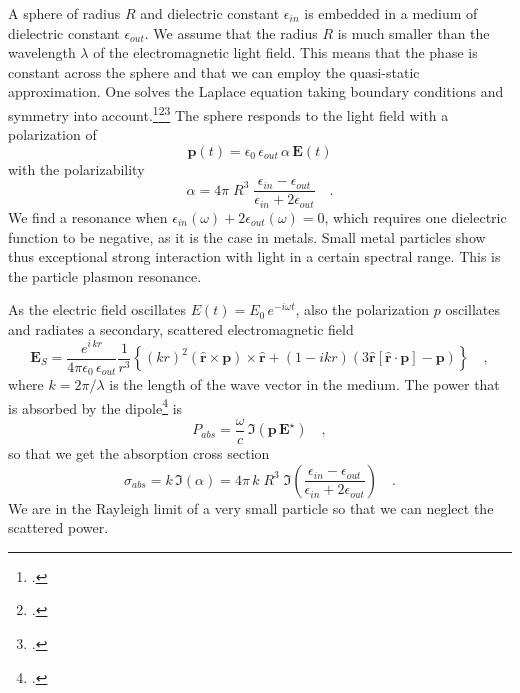 A sphere of radius $R$ and dielectric constant $\epsilon_{in}$ is embedded in a medium of dielectric constant $\epsilon_{out}$. We assume that the radius $R$ is much smaller than the wavelength $\lambda$ of the electromagnetic light field. This means that the phase is constant across the sphere and that we can employ the quasi-static approximation. One solves the Laplace equation taking  boundary conditions and symmetry into account.\footcite{Jackson-ED}\footcite[excercise 2.4.2]{Nolting-ED}\footcite[chapter 5.2]{BH-book}
The sphere responds to the light field with a polarization of
\begin{equation}
 \mathbf{p}(t) = \epsilon_0 \,  \epsilon_{out} \, \alpha \, \mathbf{E}(t)
\end{equation}
with the polarizability
\begin{equation}
 \alpha = 4 \pi  \; R^3 \; \frac{\epsilon_{in} - \epsilon_{out}}{\epsilon_{in} + 2 \epsilon_{out}} \quad .
\end{equation}
We find a resonance when $\epsilon_{in}(\omega) + 2 \epsilon_{out}(\omega) = 0$, which requires one dielectric function to be negative, as it is the case in metals. Small metal particles show thus exceptional strong interaction with light in a certain spectral range. This is the particle plasmon resonance.

As the electric field oscillates $E(t) = E_0 \, e^{-i \omega t}$, also the polarization $p$ oscillates and radiates a secondary, scattered electromagnetic field 
\begin{equation}
  \mathbf{E}_S = \frac{ e^{i \, k  r} }{4\pi\epsilon_0 \, \epsilon_{out}}  \frac{1}{r^3}\left\{
      (k r )^2 \left( \hat{\mathbf{r}} \times \mathbf{p} \right) \times \hat{\mathbf{r}} +
      \left( 1 -  i k r \right)
        \left( 3\hat{\mathbf{r}} \left[\hat{\mathbf{r}} \cdot \mathbf{p}\right] - \mathbf{p} \right)
    \right\} \quad ,
     \label{eq:5_hybrid_Escat}
\end{equation}
where $k = 2 \pi / \lambda$ is the length of the wave vector in the medium. The power that is absorbed by the dipole\footcite[Chapter 8]{Novotny-Hecht2012} is
\begin{equation}
 P_{abs} = \frac{\omega}{c} \, \Im \left( \mathbf{p} \, \mathbf{E}^\star \right)  \quad ,
\end{equation}
so that we get the absorption cross section
\begin{equation}
 \sigma_{abs} = k \, \Im ( \alpha ) =  4 \pi \, k \; R^3 \; \Im \left( \frac{\epsilon_{in} - \epsilon_{out}}{\epsilon_{in} + 2 \epsilon_{out}} \right) \quad .
 \label{eq:5_hybrid_sigma_abs}
\end{equation}
We are in the Rayleigh  limit of a very small particle so that we can neglect the scattered power. 


